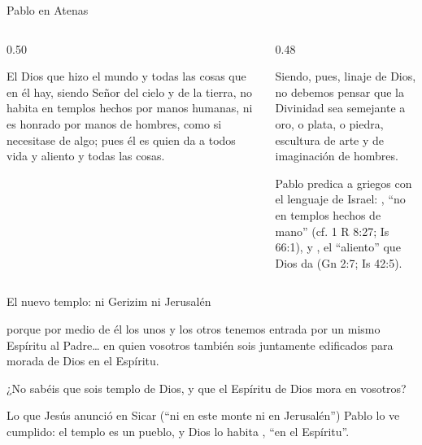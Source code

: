 \begin{frame}{Pablo en Atenas}
\begin{columns}[t,onlytextwidth]
\begin{column}{0.50\textwidth}
\begin{cita}El Dios que hizo el mundo y todas las cosas que en él hay, siendo Señor del cielo y de la tierra, no habita en templos hechos por manos humanas, ni es honrado por manos de hombres, como si necesitase de algo; pues él es quien da a todos vida y aliento y todas las cosas.\end{cita}
\end{column}
\begin{column}{0.48\textwidth}
\begin{cita}Siendo, pues, linaje de Dios, no debemos pensar que la Divinidad sea semejante a oro, o plata, o piedra, escultura de arte y de imaginación de hombres.\end{cita}
\small Pablo predica a griegos con el lenguaje de Israel: , ``no en templos hechos de mano'' (cf. 1 R 8:27; Is 66:1), y , el ``aliento'' que Dios da (Gn 2:7; Is 42:5).
\end{column}
\end{columns}\par\smallskip
{}
\end{frame}

\begin{frame}{El nuevo templo: ni Gerizim ni Jerusalén}
\begin{cita}porque por medio de él los unos y los otros tenemos entrada por un mismo Espíritu al Padre\ldots{} en quien vosotros también sois juntamente edificados para morada de Dios en el Espíritu.\end{cita}
\begin{cita}¿No sabéis que sois templo de Dios, y que el Espíritu de Dios mora en vosotros?\end{cita}
\small\RaggedRight Lo que Jesús anunció en Sicar (``ni en este monte ni en Jerusalén'') Pablo lo ve cumplido: el templo es un pueblo, y Dios lo habita , ``en el Espíritu''.\par\smallskip
{}
\end{frame}

